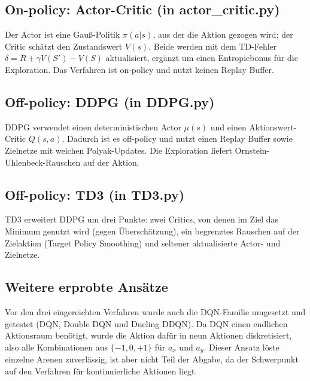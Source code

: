 \documentclass[11pt,a4paper]{article}
\begin{document}
\subsection{On-policy: Actor-Critic (in actor\_critic.py)}
Der Actor ist eine Gauß-Politik $\pi(a|s)$, aus der die Aktion gezogen wird; der Critic schätzt
den Zustandswert $V(s)$. Beide werden mit dem TD-Fehler $\delta = R + \gamma V(S') - V(S)$
aktualisiert, ergänzt um einen Entropiebonus für die Exploration. Das Verfahren ist on-policy
und nutzt keinen Replay Buffer.

\subsection{Off-policy: DDPG (in DDPG.py)}
DDPG verwendet einen deterministischen Actor $\mu(s)$ und einen Aktionswert-Critic $Q(s,a)$.
Dadurch ist es off-policy und nutzt einen Replay Buffer sowie Zielnetze mit weichen
Polyak-Updates. Die Exploration liefert Ornstein-Uhlenbeck-Rauschen auf der Aktion.

\subsection{Off-policy: TD3 (in TD3.py)}
TD3 erweitert DDPG um drei Punkte: zwei Critics, von denen im Ziel das Minimum genutzt wird
(gegen Überschätzung), ein begrenztes Rauschen auf der Zielaktion (Target Policy Smoothing)
und seltener aktualisierte Actor- und Zielnetze.

\subsection{Weitere erprobte Ansätze}
Vor den drei eingereichten Verfahren wurde auch die DQN-Familie umgesetzt und getestet
(DQN, Double DQN und Dueling DDQN). Da DQN einen endlichen Aktionsraum benötigt, wurde die
Aktion dafür in neun Aktionen diskretisiert, also alle Kombinationen aus
$\{-1,0,+1\}$ für $a_x$ und $a_y$. Dieser Ansatz löste einzelne Arenen zuverlässig, ist aber
nicht Teil der Abgabe, da der Schwerpunkt auf den Verfahren für kontinuierliche Aktionen
liegt.

\end{document}
